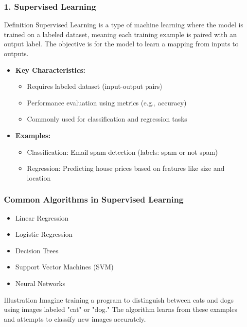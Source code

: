 \documentclass[aspectratio=169]{beamer}
\begin{document}
\begin{frame}[fragile]
    \frametitle{1. Supervised Learning}
    \begin{block}{Definition}
        Supervised Learning is a type of machine learning where the model is trained on a labeled dataset, meaning each training example is paired with an output label. The objective is for the model to learn a mapping from inputs to outputs.
    \end{block}
    \begin{itemize}
        \item \textbf{Key Characteristics:}
        \begin{itemize}
            \item Requires labeled dataset (input-output pairs)
            \item Performance evaluation using metrics (e.g., accuracy)
            \item Commonly used for classification and regression tasks
        \end{itemize}
        
        \item \textbf{Examples:}
        \begin{itemize}
            \item Classification: Email spam detection (labels: spam or not spam)
            \item Regression: Predicting house prices based on features like size and location
        \end{itemize}
    \end{itemize} 
\end{frame}

\begin{frame}[fragile]
    \frametitle{Common Algorithms in Supervised Learning}
    \begin{itemize}
        \item Linear Regression
        \item Logistic Regression
        \item Decision Trees
        \item Support Vector Machines (SVM)
        \item Neural Networks
    \end{itemize}

    \begin{block}{Illustration}
        Imagine training a program to distinguish between cats and dogs using images labeled "cat" or "dog." The algorithm learns from these examples and attempts to classify new images accurately.
    \end{block}
\end{frame}
\end{document}
